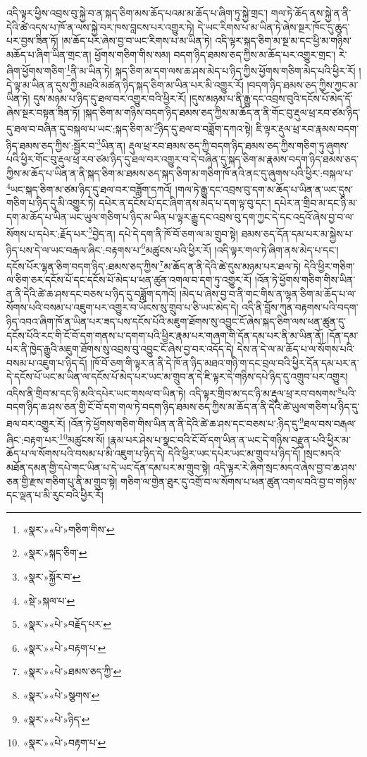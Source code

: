 འདི་ལྟར་ཕྱིས་འབྲས་བུ་སྐྱེ་བ་ན་སྐད་ཅིག་མས་ཆོད་པའམ་མ་ཆོད་པ་ཞིག་ཏུ་སྐྱེ་གྲང་། གལ་ཏེ་ཆོད་ནས་སྐྱེ་ན་ནི་དེའི་ཚེ་འདས་པ་ཁོ་ན་ལས་སྐྱེ་བར་ཁས་བླངས་པར་འགྱུར་ཏེ། དེ་ཡང་རིགས་པ་མ་ཡིན་ཏེ་ཞེས་སྔར་ཁོང་དུ་ཆུད་པར་བྱས་ཟིན་ཏོ། །མ་ཆོད་པར་ཞེས་བྱ་བ་ཡང་རིགས་པ་མ་ཡིན་ཏེ། འདི་ལྟར་སྐད་ཅིག་མ་སྔ་མ་དང་ཕྱི་མ་གཉིས་མཆོད་པ་ཞིག་ཡིན་གྲང་ན། ཕྱོགས་གཅིག་གིས་སམ། བདག་ཉིད་ཐམས་ཅད་ཀྱིས་མ་ཆོད་པར་འགྱུར་གྲང་། རེ་ཞིག་ཕྱོགས་གཅིག་\footnote{«སྣར་»«པེ་»གཅིག་གིས་}ནི་མ་ཡིན་ཏེ། སྐད་ཅིག་མ་དག་ལས་ཆ་ཤས་མེད་པ་ཉིད་ཀྱིས་ཕྱོགས་གཅིག་མེད་པའི་ཕྱིར་རོ། །དེ་ལྟ་མ་ཡིན་ན་དུས་ཀྱི་མཐའི་མཚན་ཉིད་སྐད་ཅིག་མ་ཡིན་པར་མི་འགྱུར་རོ། །བདག་ཉིད་ཐམས་ཅད་ཀྱིས་ཀྱང་མ་ཡིན་ཏེ། དུས་མཉམ་པ་ཉིད་དུ་ཐལ་བར་འགྱུར་བའི་ཕྱིར་རོ། །དུས་མཉམ་པ་ནི་རྒྱུ་དང་འབྲས་བུའི་དངོས་པོ་མེད་དོ་ཞེས་སྔར་བསྟན་ཟིན་ཏོ། །སྐད་ཅིག་མ་གཉིས་བདག་ཉིད་ཐམས་ཅད་ཀྱིས་མ་ཆོད་ན་ནི་གོང་བུ་རྡུལ་ཕྲ་རབ་ཙམ་ཉིད་དུ་ཐལ་བ་བཞིན་དུ་བསྐལ་པ་ཡང་:སྐད་ཅིག་མ་\footnote{«སྣར་»སྐད་ཅིག་}ཉིད་དུ་ཐལ་བ་བཟློག་དཀའ་སྟེ། ཇི་ལྟར་རྡུལ་ཕྲ་རབ་རྣམས་བདག་ཉིད་ཐམས་ཅད་ཀྱིས་:སྦྱོར་བ་\footnote{«སྣར་»སྐྱོར་བ་}ཡིན་ན། རྡུལ་ཕྲ་རབ་ཐམས་ཅད་ཀྱི་བདག་ཉིད་ཐམས་ཅད་ཀྱིས་གཅིག་ཏུ་ཞུགས་པའི་ཕྱིར་གོང་བུ་རྡུལ་ཕྲ་རབ་ཙམ་ཉིད་དུ་ཐལ་བར་འགྱུར་བ་དེ་བཞིན་དུ་སྐད་ཅིག་མ་རྣམས་བདག་ཉིད་ཐམས་ཅད་ཀྱིས་མ་ཆོད་པ་ཡིན་ན་ནི་སྐད་ཅིག་མ་ཐམས་ཅད་སྐད་ཅིག་མ་གཅིག་ཁོ་ནའི་ནང་དུ་ཞུགས་པའི་ཕྱིར་:བསྐལ་པ་\footnote{«སྡེ་»སྐལ་པ་}ཡང་སྐད་ཅིག་མ་ཙམ་ཉིད་དུ་ཐལ་བར་བཟློག་དཀའོ། །གལ་ཏེ་རྒྱུ་དང་འབྲས་བུ་དག་མ་ཆོད་པ་ཡིན་ན་ཡང་དུས་གཅིག་པ་ཉིད་དུ་མི་འགྱུར་ཏེ། དཔེར་ན་དངོས་པོ་དང་ཞིག་ནས་མེད་པ་དག་ལྟ་བུ་དང་། དཔེར་ན་གྲིབ་མ་དང་ཉི་མ་དག་མ་ཆོད་པ་ཡིན་ཡང་ཡུལ་གཅིག་པ་ཉིད་མ་ཡིན་པ་ལྟར་རྒྱུ་དང་འབྲས་བུ་དག་ཀྱང་དེ་དང་འདྲའོ་ཞེས་བྱ་བ་ལ་སོགས་པ་དཔེར་:རྗོད་པར་\footnote{«སྣར་»«པེ་»བརྗོད་པར་}བྱེད་ན། དཔེ་དེ་དག་ནི་ཁོ་བོ་ཅག་ལ་མ་གྲུབ་སྟེ། ཐམས་ཅད་དོན་དམ་པར་མ་སྐྱེས་པ་ཉིད་པས་དེ་ལ་ཡང་བརྒལ་ཞིང་:བརྟགས་པ་\footnote{«སྣར་»«པེ་»བརྟག་པ་}མཚུངས་པའི་ཕྱིར་རོ། །འདི་ལྟར་གལ་ཏེ་ཞིག་ནས་མེད་པ་དང་། དངོས་པོར་ལྷན་ཅིག་བདག་ཉིད་:ཐམས་ཅད་ཀྱིས་\footnote{«སྣར་»«པེ་»ཐམས་ཅད་ཀྱི་}མ་ཆོད་ན་ནི་དེའི་ཚེ་དུས་མཉམ་པར་ཐལ་ཏེ། དེའི་ཕྱིར་གཅིག་ལ་ཅིག་ཅར་དངོས་པོ་དང་དངོས་པོ་མེད་པ་ཕན་ཚུན་འགལ་བ་དག་ཏུ་འགྱུར་རོ། །འོན་ཏེ་ཕྱོགས་གཅིག་གིས་ཡིན་ན་ནི་དེའི་ཚེ་ཆ་ཤས་དང་བཅས་པ་ཉིད་དུ་བཟློག་དཀའོ། །མེད་པ་ཞེས་བྱ་བ་ནི་གང་གིས་ན་ལྷན་ཅིག་མ་ཆོད་པ་ལ་སོགས་པའི་བསམ་པ་འཇུག་པར་འགྱུར་བ་ཡོངས་སུ་གྲུབ་པ་ཅི་ཡང་མེད་དེ། འདི་ནི་བློས་ཀུན་བརྟགས་པའི་བདག་ཉིད་འབའ་ཞིག་ཁོ་ན་ཡིན་པར་ཟད་པས་དངོས་པོའི་མཇུག་ཐོགས་སུ་འབྱུང་ངོ་ཞེས་སྐད་ཅིག་ལས་ཕན་ཚུན་དུ་དངོས་པོའི་རང་གི་ངོ་བོ་དག་གནས་པ་དགག་པའི་ཕྱིར་རྣམ་པར་གཞག་གི་དོན་དམ་པར་ནི་མ་ཡིན་ནོ། །དོན་དམ་པར་ནི་ཁྱེད་རྒྱུའི་མཇུག་ཐོགས་སུ་འབྲས་བུ་འབྱུང་ངོ་ཞེས་བྱ་བར་འདོད་དེ། དེས་ན་དེ་ལ་མ་ཆོད་པ་ལ་སོགས་པའི་བསམ་པ་འཇུག་པ་ཉིད་དོ། །ཁོ་བོ་ཅག་གི་ལྟར་ན་ནི་དེ་ཁོ་ན་ཉིད་མཐའ་གཉི་ག་དང་བྲལ་བའི་ཕྱིར་དོན་དམ་པར་ན་དེ་དངོས་པོ་ཡང་མ་ཡིན་ལ་དངོས་པོ་མེད་པར་ཡང་མ་གྲུབ་ན་དེ་ཇི་ལྟར་དེ་གཉིས་དཔེ་ཉིད་དུ་འགྲུབ་པར་འགྱུར། འདིས་ནི་གྲིབ་མ་དང་ཉི་མའི་དཔེར་ཡང་གསལ་བ་ཡིན་ཏེ། འདི་ལྟར་གྲིབ་མ་དང་ཉི་མ་རྡུལ་ཕྲ་རབ་བསགས་\footnote{«སྣར་»«པེ་»སྩགས་}པའི་བདག་ཉིད་ཆ་ཤས་ཅན་གྱི་ངོ་བོ་དག་གལ་ཏེ་བདག་ཉིད་ཐམས་ཅད་ཀྱིས་མ་ཆོད་ན་ནི་དེའི་ཚེ་ཡུལ་གཅིག་པ་ཉིད་དུ་ཐལ་བར་འགྱུར་རོ། །འོན་ཏེ་ཕྱོགས་གཅིག་གིས་ཡིན་ན་ནི་དེའི་ཚེ་ཆ་ཤས་དང་བཅས་པ་:ཉིད་དུ་\footnote{«སྣར་»«པེ་»ཉིད་}ཐལ་བས་བརྒལ་ཞིང་:བརྟག་པར་\footnote{«སྣར་»«པེ་»བརྟག་པ་}མཚུངས་སོ། །རྣམ་པར་ཤེས་པ་སྣང་བའི་ངོ་བོ་དག་ཡིན་ན་ཡང་དེ་གཉིས་བརྫུན་པའི་ཕྱིར་མ་ཆོད་པ་ལ་སོགས་པའི་བསམ་པ་མི་འཇུག་པ་ཉིད་དེ། དེའི་ཕྱིར་ཡང་དཔེར་ཡང་མ་གྲུབ་པ་ཉིད་དོ། །སྲང་མདའི་མཐོན་དམན་གྱི་དཔེ་གང་ཡིན་པ་དེ་ཡང་དོན་དམ་པར་མ་གྲུབ་སྟེ། འདི་ལྟར་རེ་ཞིག་སྲང་མདའ་ཞེས་བྱ་བ་ཆ་ཤས་ཅན་གྱི་རྫས་གཅིག་པུ་ནི་མ་གྲུབ་སྟེ། གཅིག་ལ་གྱེན་ཐུར་དུ་འགྲོ་བ་ལ་སོགས་པ་ཕན་ཚུན་འགལ་བའི་བྱ་བ་གཉིས་དང་ལྡན་པ་མི་རུང་བའི་ཕྱིར་རོ། 